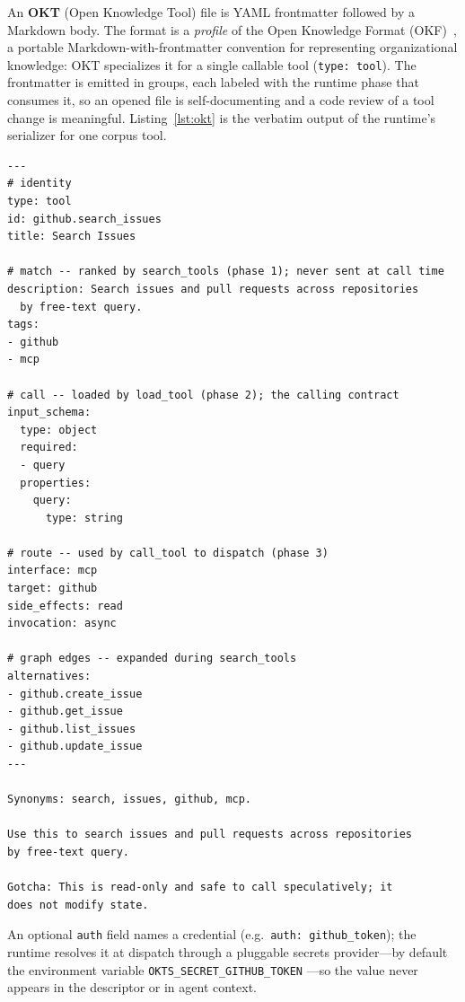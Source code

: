 \documentclass[11pt]{article}
\begin{document}
An \textbf{OKT} (Open Knowledge Tool) file is YAML frontmatter followed by a
Markdown body. The format is a \emph{profile} of the Open Knowledge Format
(OKF)~\citep{okf}, a portable Markdown-with-frontmatter convention for
representing organizational knowledge: OKT specializes it for a single callable
tool (\texttt{type:\,tool}). The frontmatter is emitted in groups, each labeled
with the runtime phase that consumes it, so an opened file is self-documenting
and a code review of a tool change is meaningful. Listing~\ref{lst:okt} is the
verbatim output of the runtime's serializer for one corpus tool.

\begin{lstlisting}[style=okt,caption={An OKT descriptor, exactly as the runtime serializes it. Frontmatter is grouped by consuming phase; the body is retrieval prose, never the calling contract. The \texttt{alternatives} edges were derived by the auto-linker, not declared by the source.},label={lst:okt}]
---
# identity
type: tool
id: github.search_issues
title: Search Issues

# match -- ranked by search_tools (phase 1); never sent at call time
description: Search issues and pull requests across repositories
  by free-text query.
tags:
- github
- mcp

# call -- loaded by load_tool (phase 2); the calling contract
input_schema:
  type: object
  required:
  - query
  properties:
    query:
      type: string

# route -- used by call_tool to dispatch (phase 3)
interface: mcp
target: github
side_effects: read
invocation: async

# graph edges -- expanded during search_tools
alternatives:
- github.create_issue
- github.get_issue
- github.list_issues
- github.update_issue
---

Synonyms: search, issues, github, mcp.

Use this to search issues and pull requests across repositories
by free-text query.

Gotcha: This is read-only and safe to call speculatively; it
does not modify state.
\end{lstlisting}

An optional \texttt{auth} field names a credential (e.g.\ \texttt{auth:
github\_token}); the runtime resolves it at dispatch through a pluggable secrets
provider---by default the environment variable \texttt{OKTS\_SECRET\_GITHUB\_TOKEN}
---so the value never appears in the descriptor or in agent context.
\end{document}
